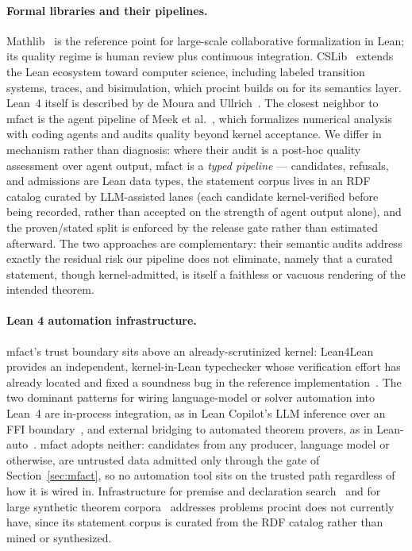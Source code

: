 \documentclass[11pt]{article}
\begin{document}
\paragraph{Formal libraries and their pipelines.}
Mathlib~\cite{mathlib2020} is the reference point for large-scale
collaborative formalization in Lean; its quality regime is human review plus
continuous integration. CSLib~\cite{cslib2026} extends the Lean ecosystem
toward computer science, including labeled transition systems, traces, and
bisimulation, which \textsf{procint} builds on for its semantics layer. Lean~4
itself is described by de Moura and Ullrich~\cite{moura2021lean4}. The
closest neighbor to \textsf{mfact} is the agent pipeline of Meek et
al.~\cite{meek2026formalizing}, which formalizes numerical analysis with
coding agents and audits quality beyond kernel acceptance. We differ in
mechanism rather than diagnosis: where their audit is a post-hoc quality
assessment over agent output, \textsf{mfact} is a \emph{typed pipeline} ---
candidates, refusals, and admissions are Lean data types, the statement
corpus lives in an RDF catalog curated by LLM-assisted lanes (each
candidate kernel-verified before being recorded, rather than accepted on
the strength of agent output alone), and the proven/stated split is
enforced by the release gate rather than estimated afterward. The two
approaches are complementary: their semantic audits address exactly the
residual risk our pipeline does not eliminate, namely that a curated
statement, though kernel-admitted, is itself a faithless or vacuous
rendering of the intended theorem.

\paragraph{Lean 4 automation infrastructure.} \textsf{mfact}'s trust
boundary sits above an already-scrutinized kernel: Lean4Lean provides an
independent, kernel-in-Lean typechecker whose verification effort has
already located and fixed a soundness bug in the reference
implementation~\cite{lean4lean2024}. The two dominant patterns for wiring
language-model or solver automation into Lean~4 are in-process integration,
as in Lean Copilot's LLM inference over an FFI boundary~\cite{leancopilot2024},
and external bridging to automated theorem provers, as in
Lean-auto~\cite{leanauto2025}. \textsf{mfact} adopts neither: candidates from
any producer, language model or otherwise, are untrusted data admitted only
through the gate of Section~\ref{sec:mfact}, so no automation tool sits on
the trusted path regardless of how it is wired in. Infrastructure for
premise and declaration search~\cite{leanexplore2025} and for large
synthetic theorem corpora~\cite{mathlib4dataset2025} addresses problems
\textsf{procint} does not currently have, since its statement corpus is
curated from the RDF catalog rather than mined or synthesized.
\end{document}
